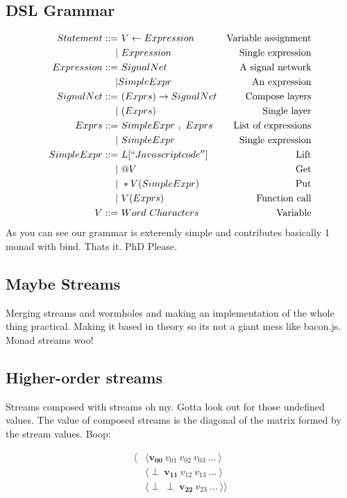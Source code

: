 \documentclass[twocolumn]{paper}
\begin{document}
\subsection{DSL Grammar}
\footnotesize
\begin{align*}
  Statement ::=& ~V \leftarrow Expression &\text{Variable assignment}\\
  |& ~Expression &\text{Single expression}\\
  Expression ::=& ~SignalNet &\text{A signal network}\\
  |& SimpleExpr &\text{An expression}\\
  SignalNet ::=& ~( Exprs ) \rightarrow SignalNet &\text{Compose layers}\\
   |& ~(Exprs ) &\text{Single layer} \\
  Exprs ::=& ~SimpleExpr ~,~ Exprs &\text{List of expressions}\\
  |& ~SimpleExpr &\text{Single expression}\\
  SimpleExpr ::=& ~L[``Javascript code''] &\text{Lift}\\
  |& ~ @V &\text{Get}\\
  |& ~ *V(SimpleExpr) &\text{Put}\\ 
  |& ~ V( Exprs ) &\text{Function call}\\
  V ::=& ~Word~Characters &\text{Variable}
\end{align*}
\normalsize
As you can see our grammar is exteremly simple and contributes basically 1 monad with bind. Thats it. PhD Please.

\subsection{Maybe Streams}
Merging streams and wormholes and making an implementation of the whole thing practical. Making it based in theory so its not a giant mess like bacon.js. Monad streams woo!

\subsection{Higher-order streams}
Streams composed with streams oh my. Gotta look out for those undefined values. The value of composed streams is the diagonal of the matrix formed by the stream values. Boop:

\begin{align*}
  \langle &\langle \mathbf{v_{00}} ~ v_{01} ~ v_{02} ~ v_{03} ~ ... ~ \rangle \\
  &\langle \perp ~ \mathbf{v_{11}} ~ v_{12} ~ v_{13} ~... ~ \rangle \\
  &\langle \perp ~ \perp ~ \mathbf{v_{22}} ~ v_{23} ~ ...  ~ \rangle \rangle
\end{align*}
\end{document}
